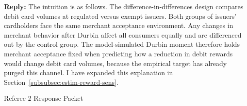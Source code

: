 \documentclass[main.tex]{subfiles}
\begin{document}
\begin{refsection}
\begin{refcommentnoclear}
\end{refcommentnoclear}

\textbf{Reply:} The intuition is as follows.
The difference-in-differences design compares debit card volumes at regulated versus exempt issuers.
Both groups of issuers' cardholders face the same merchant acceptance environment.
Any changes in merchant behavior after Durbin affect all consumers equally and are differenced out by the control group.
The model-simulated Durbin moment therefore holds merchant acceptance fixed when predicting how a reduction in debit rewards would change debit card volumes, because the empirical target has already purged this channel.
I have expanded this explanation in Section~\ref{subsubsec:estim-reward-sens}.

\clearpage
\printbibliography
\end{refsection}

\clearpage

{\color{white}\fontsize{1}{1}\selectfont Referee 2 Response Packet}

\newpage
\end{document}
